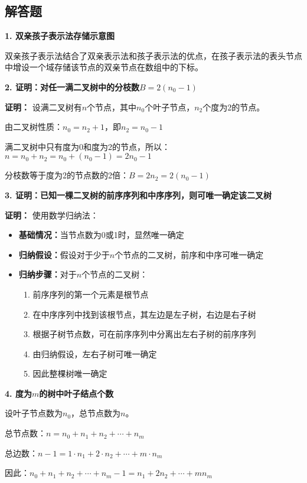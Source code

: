 \documentclass[12pt,a4paper]{amsart}
\begin{document}
\subsection{解答题}

\textbf{1. 双亲孩子表示法存储示意图}

双亲孩子表示法结合了双亲表示法和孩子表示法的优点，在孩子表示法的表头节点中增设一个域存储该节点的双亲节点在数组中的下标。

\textbf{2. 证明：对任一满二叉树中的分枝数$B=2(n_0-1)$}

\textbf{证明：}
设满二叉树有$n$个节点，其中$n_0$个叶子节点，$n_2$个度为2的节点。

由二叉树性质：$n_0 = n_2 + 1$，即$n_2 = n_0 - 1$

满二叉树中只有度为0和度为2的节点，所以：$n = n_0 + n_2 = n_0 + (n_0 - 1) = 2n_0 - 1$

分枝数等于度为2的节点数的2倍：$B = 2n_2 = 2(n_0 - 1)$

\textbf{3. 证明：已知一棵二叉树的前序序列和中序序列，则可唯一确定该二叉树}

\textbf{证明：}
使用数学归纳法：
\begin{itemize}
\item \textbf{基础情况：}当节点数为0或1时，显然唯一确定
\item \textbf{归纳假设：}假设对于少于$n$个节点的二叉树，前序和中序可唯一确定
\item \textbf{归纳步骤：}对于$n$个节点的二叉树：
  \begin{enumerate}
  \item 前序序列的第一个元素是根节点
  \item 在中序序列中找到该根节点，其左边是左子树，右边是右子树
  \item 根据子树节点数，可在前序序列中分离出左右子树的前序序列
  \item 由归纳假设，左右子树可唯一确定
  \item 因此整棵树唯一确定
  \end{enumerate}
\end{itemize}

\textbf{4. 度为$m$的树中叶子结点个数}

设叶子节点数为$n_0$，总节点数为$n$。

总节点数：$n = n_0 + n_1 + n_2 + \cdots + n_m$

总边数：$n - 1 = 1 \cdot n_1 + 2 \cdot n_2 + \cdots + m \cdot n_m$

因此：$n_0 + n_1 + n_2 + \cdots + n_m - 1 = n_1 + 2n_2 + \cdots + mn_m$
\end{document}
